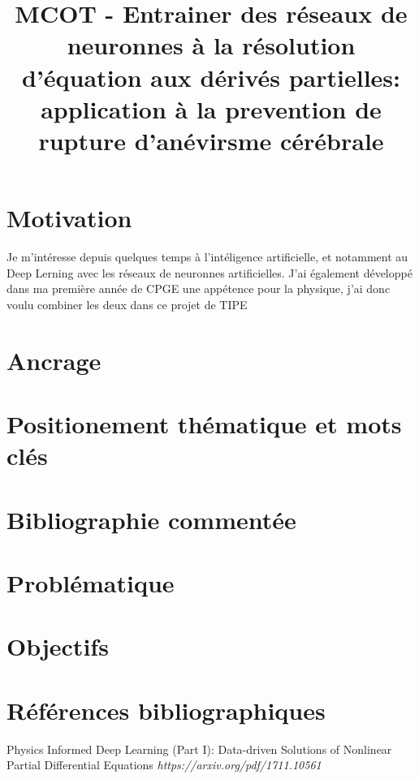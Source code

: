 \documentclass{article}
\title{MCOT - Entrainer des réseaux de neuronnes à la résolution d'équation aux dérivés partielles: application à la prevention de rupture d'anévirsme cérébrale}
\begin{document}
	\maketitle
	
	\section{Motivation}	
	
	Je m'intéresse depuis quelques temps à l'intéligence artificielle, et notamment au Deep Lerning avec les réseaux de neuronnes artificielles. J'ai également développé dans ma première année de CPGE une appétence pour la physique, j'ai donc voulu combiner les deux dans ce projet de TIPE
	
	\section{Ancrage}

	\section{Positionement thématique et mots clés}
	
	\section{Bibliographie commentée}	
	
	\section{Problématique}	
	
	\section{Objectifs}
	
	\section{Références bibliographiques}
	
	\begin{thebibliography}{2} %

	 Physics Informed Deep Learning (Part I): Data-driven
Solutions of Nonlinear Partial Differential Equations \emph{https://arxiv.org/pdf/1711.10561}

\end{thebibliography}
\end{document}
